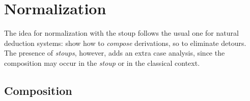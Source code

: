 \documentclass{article}
\newcommand{\stoup}{\emph{stoup}}
\newcommand{\efc}{$\to_c$-elim}
\newcommand{\efi}{$\to_i$-elim}
\newcommand{\ifc}{$\to_c$-int}
\begin{document}

%
\section{Normalization}\label{sec:normalization}

The idea for normalization with the stoup follows the usual one for natural deduction systems: show how to \emph{compose} derivations, so to eliminate detours. The presence of \emph{stoups}, however, adds an extra case analysis, since the composition may occur in the \stoup{} or in the classical context.

\subsection{Composition}
\end{document}
